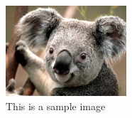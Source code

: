 \usepackage{graphicx}

\begin{figure}[h!]
	\centering
	\caption{This is a sample image}
	\includegraphics[width=0.4\textwidth]{SamplePicture}
\end{figure}
